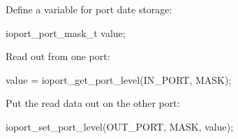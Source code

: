 \begin{DoxyEnumerate}
\item Define a variable for port date storage\-:
\begin{DoxyItemize}
\item 
\begin{DoxyCode}
 ioport\_port\_mask\_t value; 
\end{DoxyCode}

\end{DoxyItemize}
\item Read out from one port\-:
\begin{DoxyItemize}
\item 
\begin{DoxyCode}
 value = ioport\_get\_port\_level(IN\_PORT, MASK); 
\end{DoxyCode}

\end{DoxyItemize}
\item Put the read data out on the other port\-:
\begin{DoxyItemize}
\item 
\begin{DoxyCode}
 ioport\_set\_port\_level(OUT\_PORT, MASK, value); 
\end{DoxyCode}
 
\end{DoxyItemize}
\end{DoxyEnumerate}